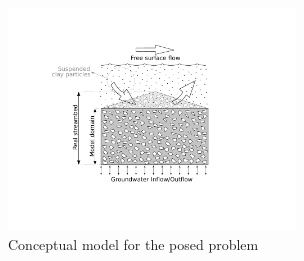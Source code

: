 \documentclass[draft,linenumbers]{agujournal2018}
\begin{document}
\begin{figure}[ht]
\centering
\includegraphics[clip, trim=4.2cm 4.5cm 8cm 3cm, width=18pc]
{1807010Conceptual.pdf}
\caption{Conceptual model for the posed problem}
\label{Conceptual}
\end{figure}
\end{document}
